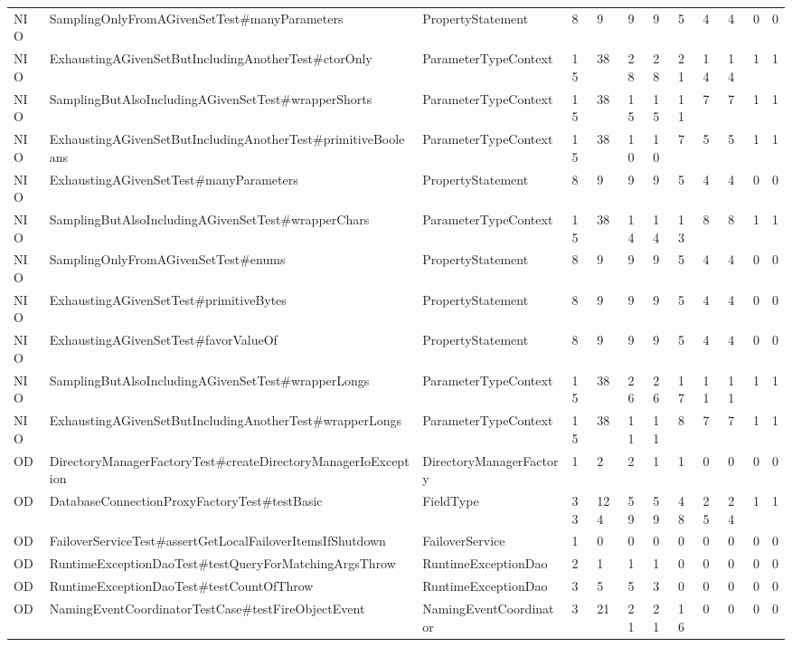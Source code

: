 \begin{table}[t]
\begin{tabular}{llllllllllll}
NIO & SamplingOnlyFromAGivenSetTest\#manyParameters & PropertyStatement & 8 & 9 & 9 & 9 & 5 & 4 & 4 & 0 & 0 \\
NIO & ExhaustingAGivenSetButIncludingAnotherTest\#ctorOnly & ParameterTypeContext & 15 & 38 & 28 & 28 & 21 & 14 & 14 & 1 & 1 \\
NIO & SamplingButAlsoIncludingAGivenSetTest\#wrapperShorts & ParameterTypeContext & 15 & 38 & 15 & 15 & 11 & 7 & 7 & 1 & 1 \\
NIO & ExhaustingAGivenSetButIncludingAnotherTest\#primitiveBooleans & ParameterTypeContext & 15 & 38 & 10 & 10 & 7 & 5 & 5 & 1 & 1 \\
NIO & ExhaustingAGivenSetTest\#manyParameters & PropertyStatement & 8 & 9 & 9 & 9 & 5 & 4 & 4 & 0 & 0 \\
NIO & SamplingButAlsoIncludingAGivenSetTest\#wrapperChars & ParameterTypeContext & 15 & 38 & 14 & 14 & 13 & 8 & 8 & 1 & 1 \\
NIO & SamplingOnlyFromAGivenSetTest\#enums & PropertyStatement & 8 & 9 & 9 & 9 & 5 & 4 & 4 & 0 & 0 \\
NIO & ExhaustingAGivenSetTest\#primitiveBytes & PropertyStatement & 8 & 9 & 9 & 9 & 5 & 4 & 4 & 0 & 0 \\
NIO & ExhaustingAGivenSetTest\#favorValueOf & PropertyStatement & 8 & 9 & 9 & 9 & 5 & 4 & 4 & 0 & 0 \\
NIO & SamplingButAlsoIncludingAGivenSetTest\#wrapperLongs & ParameterTypeContext & 15 & 38 & 26 & 26 & 17 & 11 & 11 & 1 & 1 \\
NIO & ExhaustingAGivenSetButIncludingAnotherTest\#wrapperLongs & ParameterTypeContext & 15 & 38 & 11 & 11 & 8 & 7 & 7 & 1 & 1 \\
OD & DirectoryManagerFactoryTest\#createDirectoryManagerIoException & DirectoryManagerFactory & 1 & 2 & 2 & 1 & 1 & 0 & 0 & 0 & 0 \\
OD & DatabaseConnectionProxyFactoryTest\#testBasic & FieldType & 33 & 124 & 59 & 59 & 48 & 25 & 24 & 1 & 1 \\
OD & FailoverServiceTest\#assertGetLocalFailoverItemsIfShutdown & FailoverService & 1 & 0 & 0 & 0 & 0 & 0 & 0 & 0 & 0 \\
OD & RuntimeExceptionDaoTest\#testQueryForMatchingArgsThrow & RuntimeExceptionDao & 2 & 1 & 1 & 1 & 0 & 0 & 0 & 0 & 0 \\
OD & RuntimeExceptionDaoTest\#testCountOfThrow & RuntimeExceptionDao & 3 & 5 & 5 & 3 & 0 & 0 & 0 & 0 & 0 \\
OD & NamingEventCoordinatorTestCase\#testFireObjectEvent & NamingEventCoordinator & 3 & 21 & 21 & 21 & 16 & 0 & 0 & 0 & 0 \\

\end{tabular}
\end{table}
